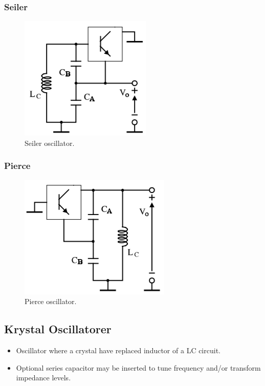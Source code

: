 \subsubsection{Seiler}
\begin{figure} [H]
	\centering
	\includegraphics[width=0.4\linewidth]{graphics/43.png}
	\caption{Seiler oscillator.}
	\label{fig:43}
\end{figure}

\subsubsection{Pierce}
\begin{figure} [H]
	\centering
	\includegraphics[width=0.45\linewidth]{graphics/42.png}
	\caption{Pierce oscillator.}
	\label{fig:44}
\end{figure}

\subsection{Krystal Oscillatorer}
\begin{itemize}
	\item Oscillator where a crystal have replaced inductor of a LC circuit.
	\item Optional series capacitor may be inserted to tune	frequency and/or transform impedance levels.
\end{itemize}
